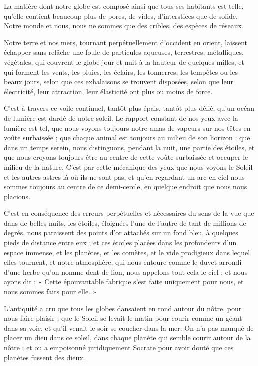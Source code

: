 \documentclass[a4paper, 11pt, oneside, landscape]{article}
\begin{document}
La matière dont notre globe est composé ainsi que tous ses habitants est telle, qu'elle contient beaucoup plus de pores, de vides, d'interstices que de solide. Notre monde et nous, nous ne sommes que des cribles, des espèces de réseaux.

Notre terre et nos mers, tournant perpétuellement d'occident en orient, laissent échapper sans relâche une foule de particules aqueuses, terrestres, métalliques, végétales, qui couvrent le globe jour et nuit à la hauteur de quelques milles, et qui forment les vents, les pluies, les éclairs, les tonnerres, les tempêtes ou les beaux jours, selon que ces exhalaisons se trouvent disposées, selon que leur électricité, leur attraction, leur élasticité ont plus ou moins de force.

C'est à travers ce voile continuel, tantôt plus épais, tantôt plus délié, qu'un océan de lumière est dardé de notre soleil. Le rapport constant de nos yeux avec la lumière est tel, que nous voyons toujours notre amas de vapeurs sur nos têtes en voûte surbaissée ; que chaque animal est toujours au milieu de son horizon ; que dans un temps serein, nous distinguons, pendant la nuit, une partie des étoiles, et que nous croyons toujours être au centre de cette voûte surbaissée et occuper le milieu de la nature. C'est par cette mécanique des yeux que nous voyons le Soleil et les autres astres là où ils ne sont pas, et qu'en regardant un arc-en-ciel nous sommes toujours au centre de ce demi-cercle, en quelque endroit que nous nous placions.

C'est en conséquence des erreurs perpétuelles et nécessaires du sens de la vue que dans de belles nuits, les étoiles, éloignées l'une de l'autre de tant de millions de degrés, nous paraissent des points d'or attachés sur un fond bleu, à quelques pieds de distance entre eux ; et ces étoiles placées dans les profondeurs d'un espace immense, et les planètes, et les comètes, et le vide prodigieux dans lequel elles tournent, et notre atmosphère, qui nous entoure comme le duvet arrondi d'une herbe qu'on nomme dent-de-lion, nous appelons tout cela le ciel ; et nous ayons dit : « Cette épouvantable fabrique s'est faite uniquement pour nous, et nous sommes faits pour elle. »

L'antiquité a cru que tous les globes dansaient en rond autour du nôtre, pour nous faire plaisir ; que le Soleil se levait le matin pour courir comme un géant dans sa voie, et qu'il venait le soir se coucher dans la mer. On n'a pas manqué de placer un dieu dans ce soleil, dans chaque planète qui semble courir autour de la nôtre ; et ou a empoisonné juridiquement Socrate pour avoir douté que ces planètes fussent des dieux.
\end{document}
